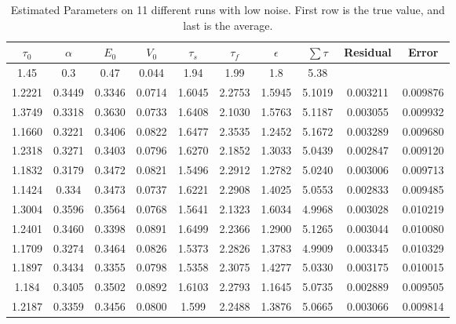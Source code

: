 \begin{table}[t]
\centering
\begin{tabular}{|c | c | c | c | c | c | c | c | c | c |}
\hline 
$\tau_0$ & $\alpha$ & $E_0$    & $V_0$    & $\tau_s$ & $\tau_f$ & $\epsilon$  & $ \sum \tau $ & Residual & Error\\
\hline 
\rowcolor[gray]{.8}
1.45 & 0.3 & 0.47 & 0.044 & 1.94 & 1.99 & 1.8  & 5.38 &  & \\
\hline 
\hline 
1.2221 & 0.3449 & 0.3346 & 0.0714 & 1.6045 & 2.2753 & 1.5945 & 5.1019 &  0.003211  & 0.009876  \\
1.3749 & 0.3318 & 0.3630 & 0.0733 & 1.6408 & 2.1030 & 1.5763 & 5.1187 &  0.003055  & 0.009932  \\
1.1660 & 0.3221 & 0.3406 & 0.0822 & 1.6477 & 2.3535 & 1.2452 & 5.1672 &  0.003289  & 0.009680  \\
1.2318 & 0.3271 & 0.3403 & 0.0796 & 1.6270 & 2.1852 & 1.3033 & 5.0439 &  0.002847  & 0.009120  \\
1.1832 & 0.3179 & 0.3472 & 0.0821 & 1.5496 & 2.2912 & 1.2782 & 5.0240 &  0.003006  & 0.009713  \\
1.1424 & 0.334  & 0.3473 & 0.0737 & 1.6221 & 2.2908 & 1.4025 & 5.0553 &  0.002833  & 0.009485  \\
1.3004 & 0.3596 & 0.3564 & 0.0768 & 1.5641 & 2.1323 & 1.6034 & 4.9968 &  0.003028  & 0.010219  \\
1.2401 & 0.3460 & 0.3398 & 0.0891 & 1.6499 & 2.2366 & 1.2900 & 5.1265 &  0.003044  & 0.010080  \\
1.1709 & 0.3274 & 0.3464 & 0.0826 & 1.5373 & 2.2826 & 1.3783 & 4.9909 &  0.003345  & 0.010329  \\
1.1897 & 0.3434 & 0.3355 & 0.0798 & 1.5358 & 2.3075 & 1.4277 & 5.0330 &  0.003175  & 0.010015  \\
1.184 &  0.3405 & 0.3502 & 0.0892 & 1.6103 & 2.2793 & 1.1645 & 5.0735 &  0.002889  & 0.009505  \\
\hline                                                                           
1.2187 & 0.3359 & 0.3456 & 0.0800 & 1.599 & 2.2488 & 1.3876 & 5.0665 & 0.003066     & 0.009814 \\
\hline 
\end{tabular}
\caption{Estimated Parameters on 11 different runs with low noise. First row is the true value, and last is the average.}
\label{tab:LowNoiseResults} 
\end{table}

